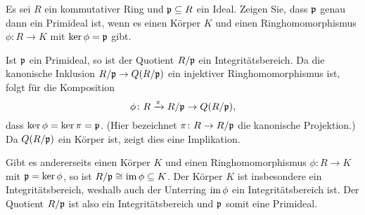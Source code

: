 \begin{question}
  Es sei $R$ ein kommutativer Ring und $\mathfrak{p} \subseteq R$ ein Ideal.
  Zeigen Sie, dass $\mathfrak{p}$ genau dann ein Primideal ist, wenn es einen Körper $K$ und einen Ringhomomorphismus $\phi \colon R \to K$ mit $\ker \phi = \mathfrak{p}$ gibt.
\end{question}


\begin{solution}
  Ist $\mathfrak{p}$ ein Primideal, so ist der Quotient $R/\mathfrak{p}$ ein Integritätsbereich.
  Da die kanonische Inklusion $R/\mathfrak{p} \to Q(R/\mathfrak{p})$ ein injektiver Ringhomomorphismus ist, folgt für die Komposition
  \[
    \phi \colon R \xrightarrow{\pi} R/\mathfrak{p} \to Q(R/\mathfrak{p}),
  \]
  dass $\ker \phi = \ker \pi = \mathfrak{p}$.
  (Hier bezeichnet $\pi \colon R \to R/\mathfrak{p}$ die kanonische Projektion.)
  Da $Q(R/\mathfrak{p})$ ein Körper ist, zeigt dies eine Implikation.
  
  Gibt es andererseits einen Körper $K$ und einen Ringhomomorphismus $\phi \colon R \to K$ mit $\mathfrak{p} = \ker \phi$, so ist $R/\mathfrak{p} \cong \operatorname{im} \phi \subseteq K$.
  Der Körper $K$ ist insbesondere ein Integritätsbereich, weshalb auch der Unterring $\operatorname{im} \phi$ ein Integritätsbereich ist.
  Der Quotient $R/\mathfrak{p}$ ist also ein Integritätsbereich und $\mathfrak{p}$ somit eine Primideal.
\end{solution}


